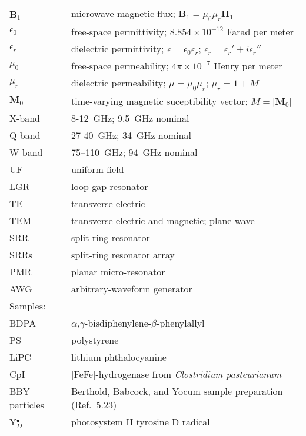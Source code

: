 \documentclass[11pt,a4paper,openany,twoside,english,titlepage=true]{scrbook}
\begin{document}
\begin{table}[ht!]
\begin{tabular}{ll}
\textbf{B}$_1$  & microwave magnetic flux; $\textbf{B}_1 = \mu_0 \mu_r \textbf{H}_1$\\
$\epsilon_0$    & free-space permittivity; $8.854\times10^{-12}$ Farad per meter\\
$\epsilon_r$    & dielectric permittivity; $\epsilon = \epsilon_0 \epsilon_r$; $\epsilon_r = \epsilon_r' + i \epsilon_r''$ \\
$\mu_0$         & free-space permeability; $4 \pi \times10^{-7}$ Henry per meter\\
$\mu_r$         & dielectric permeability; $\mu = \mu_0 \mu_r$; $\mu_r = 1 + M$ \\
$\mathbf{M}_0$  & time-varying magnetic suceptibility vector; $M = |\mathbf{M}_0|$ \\
X-band          & 8-12~GHz; 9.5~GHz nominal \\ 
Q-band          & 27-40~GHz; 34~GHz nominal \\ 
W-band          & 75–110~GHz; 94~GHz nominal \\  
UF              & uniform field \\ 
LGR             & loop-gap resonator \\ 
TE              & transverse electric \\
TEM             & transverse electric and magnetic; plane wave \\
SRR             & split-ring resonator \\
SRRs            & split-ring resonator array \\
PMR             & planar micro-resonator \\ 
AWG             & arbitrary-waveform generator \\ \hline \hline
\rowcolor{LightCyan}
Samples:        & \\ \hline
BDPA            & $\alpha$,$\gamma$-bisdiphenylene-$\beta$-phenylallyl \\
PS              & polystyrene \\
LiPC            & lithium phthalocyanine \\
CpI             & [FeFe]-hydrogenase from \textit{Clostridium pasteurianum} \\
BBY particles   & Berthold, Babcock, and Yocum sample preparation (Ref.~5.23) $\qquad$\\
Y$_D^\bullet$   & photosystem II tyrosine D radical \\ \hline \hline
\end{tabular}
\end{table}
\vfill	
\end{document}
